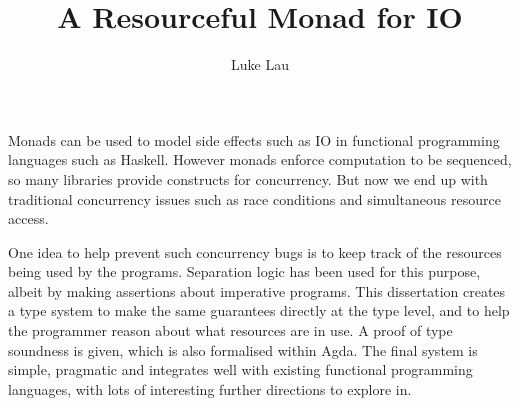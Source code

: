 \documentclass{article}
\begin{document}
\author{Luke Lau}
\title{A Resourceful Monad for IO}
\maketitle

Monads can be used to model side effects such as IO in functional
programming languages such as Haskell. However monads enforce
computation to be sequenced, so many libraries provide constructs for
concurrency. But now we end up with traditional concurrency issues
such as race conditions and simultaneous resource access.

One idea to help prevent such concurrency bugs is to keep track of the
resources being used by the programs. Separation logic has been used
for this purpose, albeit by making assertions about imperative
programs.  This dissertation creates a type system to make the same
guarantees directly at the type level, and to help the programmer
reason about what resources are in use. A proof of type soundness is
given, which is also formalised within Agda. The final system is
simple, pragmatic and integrates well with existing functional
programming languages, with lots of interesting further directions to
explore in.
\end{document}
